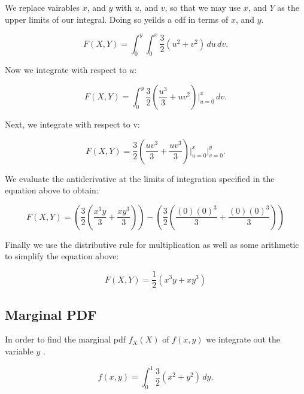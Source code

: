 \documentclass[a4paper,11pt]{article}
\begin{document}
We replace vairables $x$, and $y$ with $u$, and $v$, so that we may use
$x$, and $Y$ as the upper limits of our integral.  Doing so yeilds a cdf in
terms of $x$, and $y$.


\begin{equation}
F\left( X, Y \right) = \int_0^y \int_0^x \frac{3}{2}\left( u^2
  + v^2 \right) \,du \,dv.
\end{equation}

Now we integrate with respect to $u$:

\begin{equation}
F\left( X, Y \right) = \int_0^y  \frac{3}{2}\left( \frac{u^3}{3}
  + uv^2 \right) \bigg\rvert_{u=0}^x \,dv.
\end{equation}

Next, we integrate with respect to v:

\begin{equation}
F\left( X, Y \right) =   \frac{3}{2}\left( \frac{uv^3}{3}
  + \frac{uv^3}{3} \right) \bigg\rvert_{u=0}^x \bigg\rvert_{v=0}^{y}.
\end{equation}

We evaluate the antiderivative at the limits of integration specified in the
equation above to obtain:


\begin{equation}
F\left( X, Y \right) =   \left( \frac{3}{2}\left( \frac{x^{3}y}{3}
  + \frac{xy^3}{3} \right)  \right) -
  \left( \frac{3}{2}\left( \frac{\left(0 \right) \left(0 \right)^3}{3}
  + \frac{\left(0 \right) \left( 0 \right) ^3}{3} \right)  \right)
\end{equation}

Finally we use the distributive rule for multiplication as well as some arithmetic
to simplify the equation above:

\begin{equation}
F\left( X, Y \right) =  \frac{1}{2}\left( x^{3}y + xy^3  \right)
\end{equation}

\subsection{Marginal PDF}

In order to find the marginal pdf $f_{X}\left(X \right)$ of
$f\left( x, y \right)$ we integrate out the variable $y$ \cite{reading7}.

\begin{equation}
  f\left( x, y \right) = \int_0^1 \frac{3}{2}\left( x^2 + y^2 \right) \,dy.
\end{equation}
\end{document}
